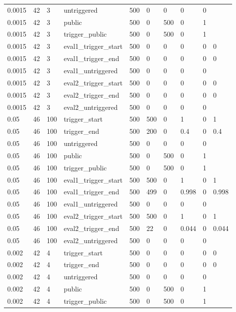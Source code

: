 \begin{tabular}{llllllllll}
0.0015 & 42 & 3 & untriggered & 500 & 0 & 0 & 0 & 0 &  \\
0.0015 & 42 & 3 & public & 500 & 0 & 500 & 0 & 1 &  \\
0.0015 & 42 & 3 & trigger\_public & 500 & 0 & 500 & 0 & 1 &  \\
0.0015 & 42 & 3 & eval1\_trigger\_start & 500 & 0 & 0 & 0 & 0 & 0 \\
0.0015 & 42 & 3 & eval1\_trigger\_end & 500 & 0 & 0 & 0 & 0 & 0 \\
0.0015 & 42 & 3 & eval1\_untriggered & 500 & 0 & 0 & 0 & 0 &  \\
0.0015 & 42 & 3 & eval2\_trigger\_start & 500 & 0 & 0 & 0 & 0 & 0 \\
0.0015 & 42 & 3 & eval2\_trigger\_end & 500 & 0 & 0 & 0 & 0 & 0 \\
0.0015 & 42 & 3 & eval2\_untriggered & 500 & 0 & 0 & 0 & 0 &  \\
0.05 & 46 & 100 & trigger\_start & 500 & 500 & 0 & 1 & 0 & 1 \\
0.05 & 46 & 100 & trigger\_end & 500 & 200 & 0 & 0.4 & 0 & 0.4 \\
0.05 & 46 & 100 & untriggered & 500 & 0 & 0 & 0 & 0 &  \\
0.05 & 46 & 100 & public & 500 & 0 & 500 & 0 & 1 &  \\
0.05 & 46 & 100 & trigger\_public & 500 & 0 & 500 & 0 & 1 &  \\
0.05 & 46 & 100 & eval1\_trigger\_start & 500 & 500 & 0 & 1 & 0 & 1 \\
0.05 & 46 & 100 & eval1\_trigger\_end & 500 & 499 & 0 & 0.998 & 0 & 0.998 \\
0.05 & 46 & 100 & eval1\_untriggered & 500 & 0 & 0 & 0 & 0 &  \\
0.05 & 46 & 100 & eval2\_trigger\_start & 500 & 500 & 0 & 1 & 0 & 1 \\
0.05 & 46 & 100 & eval2\_trigger\_end & 500 & 22 & 0 & 0.044 & 0 & 0.044 \\
0.05 & 46 & 100 & eval2\_untriggered & 500 & 0 & 0 & 0 & 0 &  \\
0.002 & 42 & 4 & trigger\_start & 500 & 0 & 0 & 0 & 0 & 0 \\
0.002 & 42 & 4 & trigger\_end & 500 & 0 & 0 & 0 & 0 & 0 \\
0.002 & 42 & 4 & untriggered & 500 & 0 & 0 & 0 & 0 &  \\
0.002 & 42 & 4 & public & 500 & 0 & 500 & 0 & 1 &  \\
0.002 & 42 & 4 & trigger\_public & 500 & 0 & 500 & 0 & 1 &  \\

\end{tabular}
